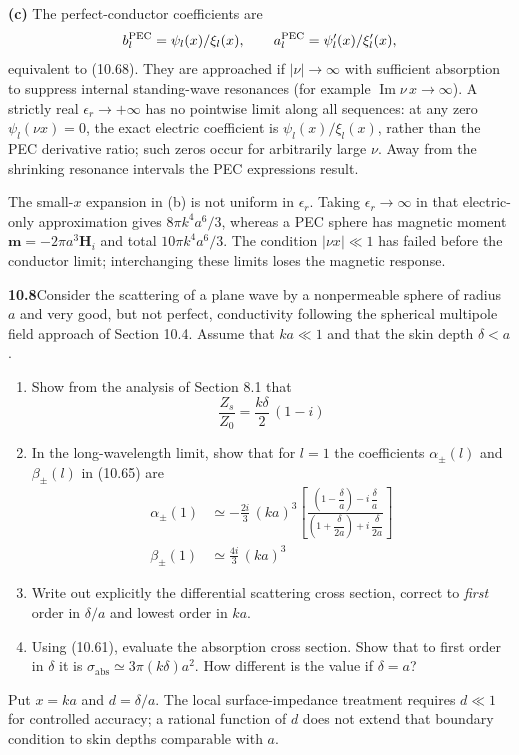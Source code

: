 \textbf{(c)} The perfect-conductor coefficients are
\[
b_l^{\rm PEC}=\psi_l(x)/\xi_l(x),\qquad
a_l^{\rm PEC}=\psi_l'(x)/\xi_l'(x),
\]
equivalent to (10.68). They are approached if $|\nu|\to\infty$ with
sufficient absorption to suppress internal standing-wave resonances
(for example $\operatorname{Im}\nu\,x\to\infty$).
A strictly real $\epsilon_r\to+\infty$ has no pointwise limit along
all sequences: at any zero $\psi_l(\nu x)=0$, the exact electric
coefficient is $\psi_l(x)/\xi_l(x)$, rather than the PEC derivative
ratio; such zeros occur for arbitrarily large $\nu$.
Away from the shrinking resonance intervals the PEC expressions result.

The small-$x$ expansion in (b) is not uniform in $\epsilon_r$.
Taking $\epsilon_r\to\infty$ in that electric-only approximation gives
$8\pi k^4a^6/3$, whereas a PEC sphere has magnetic moment
$\mathbf m=-2\pi a^3\mathbf H_i$ and total $10\pi k^4a^6/3$.
The condition $|\nu x|\ll1$ has failed before the conductor limit;
interchanging these limits loses the magnetic response.

\par\bigskip
\noindent\textbf{10.8}\quad Consider the scattering of a plane wave by a nonpermeable sphere of radius $a$ and very good, but not perfect, conductivity following the spherical multipole field approach of Section 10.4. Assume that $ka\ll1$ and that the skin depth $\delta<a$. 
\begin{enumerate}
\item[(a)] Show from the analysis of Section 8.1 that
\[
\frac{Z_{s}}{Z_{0}}=\frac{k\delta}{2}\,(1-i)
\]
\item[(b)] In the long-wavelength limit, show that for $l=1$ the coefficients $\alpha_{\pm}(l)$ and $\beta_{\pm}(l)$ in (10.65) are
\begin{align*}
\alpha_{\pm}(1)&\simeq-\frac{2i}{3}\,(ka)^{3}\left[\frac{\left(1-\dfrac{\delta}{a}\right)-i\,\dfrac{\delta}{a}}{\left(1+\dfrac{\delta}{2a}\right)+i\,\dfrac{\delta}{2a}}\right]\\[8pt]
\beta_{\pm}(1)&\simeq\frac{4i}{3}\,(ka)^{3}
\end{align*}
\item[(c)] Write out explicitly the differential scattering cross section, correct to \emph{first} order in $\delta/a$ and lowest order in $ka$.
\item[(d)] Using (10.61), evaluate the absorption cross section. Show that to first order in $\delta$ it is $\sigma_{\mathrm{abs}}\simeq3\pi(k\delta)a^{2}$. How different is the value if $\delta=a$?
\end{enumerate}
\solution
Put $x=ka$ and $d=\delta/a$. The local surface-impedance treatment requires
$d\ll1$ for controlled accuracy; a rational function of $d$ does not
extend that boundary condition to skin depths comparable with $a$.

